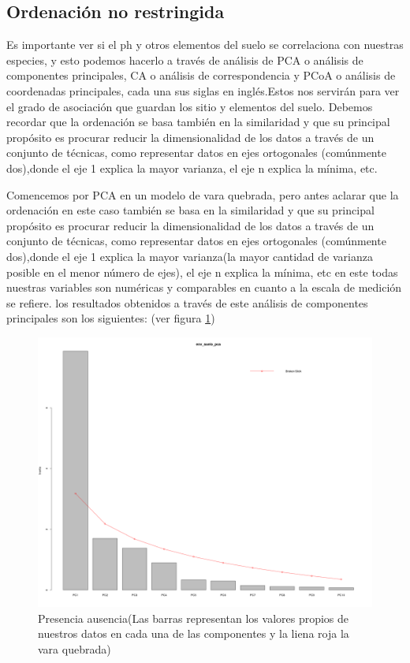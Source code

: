 \documentclass[11pt,]{article}
\begin{document}
\subsection{Ordenación no
restringida}\label{ordenaciuxf3n-no-restringida}

Es importante ver si el ph y otros elementos del suelo se correlaciona
con nuestras especies, y esto podemos hacerlo a través de análisis de
PCA o análisis de componentes principales, CA o análisis de
correspondencia y PCoA o análisis de coordenadas principales, cada una
sus siglas en inglés.Estos nos servirán para ver el grado de asociación
que guardan los sitio y elementos del suelo. Debemos recordar que la
ordenación se basa también en la similaridad y que su principal
propósito es procurar reducir la dimensionalidad de los datos a través
de un conjunto de técnicas, como representar datos en ejes ortogonales
(comúnmente dos),donde el eje 1 explica la mayor varianza, el eje n
explica la mínima, etc.

Comencemos por PCA en un modelo de vara quebrada, pero antes aclarar que
la ordenación en este caso también se basa en la similaridad y que su
principal propósito es procurar reducir la dimensionalidad de los datos
a través de un conjunto de técnicas, como representar datos en ejes
ortogonales (comúnmente dos),donde el eje 1 explica la mayor varianza(la
mayor cantidad de varianza posible en el menor número de ejes), el eje n
explica la mínima, etc en este todas nuestras variables son numéricas y
comparables en cuanto a la escala de medición se refiere. los resultados
obtenidos a través de este análisis de componentes principales son los
siguientes: (ver figura \ref{fig:PCA_1})

\begin{figure}
\centering
\includegraphics{PCA_1.png}
\caption{\label{fig:PCA_1}Presencia ausencia(Las barras representan los
valores propios de nuestros datos en cada una de las componentes y la
liena roja la vara quebrada)}
\end{figure}
\end{document}
